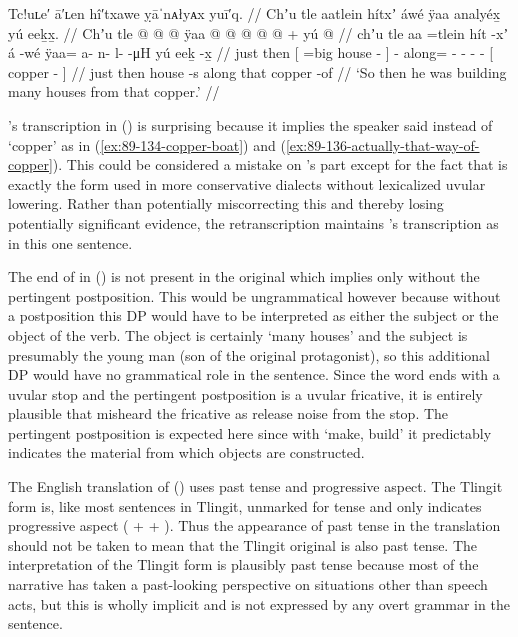 \ex\label{ex:89-140-building-lotsa-houses-from-copper}%
%
\begingl
	\glpreamble	Tc!uʟe′ ā′ʟen hî′txawe ỵāˈnᴀłyᴀx yuī′q. //
	\glpreamble	Chʼu tle aatlein hítxʼ áwé ÿaa analyéx̱ yú eeḵx̱. //
	\gla	Chʼu tle {}  @ {}  @ {} {}  @ {}
		ÿaa @  @ {} @ {} @ {} @ {} +
		{} yú  @ {} {} //
	\glb	chʼu tle {} aa =tlein hít -xʼ {} á -wé
		ÿaa= a- n- l-  -μH
		{} yú eeḵ -x̱ {} //
	\glc	just then {}[  =big house - {}]  -
		along= - - -  -
		{}[  copper - {}] //
	\gld	just then {}  {} house -s {}  {}
		along  {} {} {} {}
		{} that copper -of {} //
	\glft	‘So then he was building many houses from that copper.’
		//
\endgl
\xe

\citeauthor{swanton:1909}’s transcription  in (\lastx) is surprising because it implies the speaker said  instead of  ‘copper’ as in (\ref{ex:89-134-copper-boat}) and (\ref{ex:89-136-actually-that-way-of-copper}).
This could be considered a mistake on \citeauthor{swanton:1909}’s part except for the fact that  is exactly the form used in more conservative dialects without lexicalized uvular lowering.
Rather than potentially miscorrecting this and thereby losing potentially significant evidence, the retranscription maintains \citeauthor{swanton:1909}’s transcription as  in this one sentence.

The end of  in (\lastx) is not present in the original which implies only  without the pertingent postposition.
This would be ungrammatical however because without a postposition this DP would have to be interpreted as either the subject or the object of the verb.
The object is certainly  ‘many houses’ and the subject is presumably the young man (son of the original protagonist), so this additional DP would have no grammatical role in the sentence.
Since the word  ends with a uvular stop and the pertingent postposition  is a uvular fricative, it is entirely plausible that \citeauthor{swanton:1909} misheard the fricative as release noise from the stop.
The pertingent postposition is expected here since with  ‘make, build’ it predictably indicates the material from which objects are constructed.

The English translation of (\lastx) uses past tense and progressive aspect.
The Tlingit form is, like most sentences in Tlingit, unmarked for tense and only indicates progressive aspect ( +  + ).
Thus the appearance of past tense in the translation should not be taken to mean that the Tlingit original is also past tense.
The interpretation of the Tlingit form is plausibly past tense because most of the narrative has taken a past-looking perspective on situations other than speech acts, but this is wholly implicit and is not expressed by any overt grammar in the sentence.

